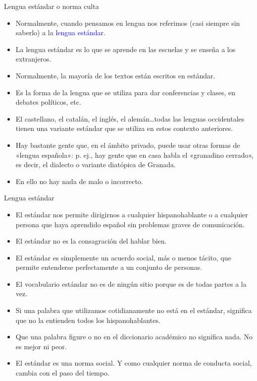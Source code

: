 \documentclass[handout]{beamer}
\begin{document}
\begin{frame}{Lengua estándar o norma culta}
\begin{itemize}
	\item Normalmente, cuando pensamos en lengua nos referimos (casi siempre sin saberlo) a la \textcolor{blue}{lengua estándar}.
	\item La lengua estándar es lo que se aprende en las escuelas y se enseña a los extranjeros.
	\item Normalmente, la mayoría de los textos están escritos en estándar.
	\item Es la forma de la lengua que se utiliza para dar conferencias y clases, en debates políticos, etc.
	\item El castellano, el catalán, el inglés, el alemán\ldots todas las lenguas occidentales tienen una variante estándar que se utiliza en estos contexto anteriores.
	\item Hay bastante gente que, en el ámbito privado, puede usar otras formas de «lengua española»: p. ej., hay gente que en casa habla el «granadino cerrado», es decir, el dialecto o variante diatópica de Granada.
	\item En ello no hay nada de malo o incorrecto.
\end{itemize}
\end{frame}

\begin{frame}{Lengua estándar}
\begin{itemize}
	\item El estándar nos permite dirigirnos a cualquier hispanohablante o a cualquier persona que haya aprendido español sin problemas graves de comunicación. 	
	\item El estándar no es la consagración del hablar bien.
	\item El estándar es simplemente un acuerdo social, más o menos tácito, que permite entenderse perfectamente a un conjunto de personas. 
	\item El vocabulario estándar no es de ningún sitio porque es de todas partes a la vez.
	\item Si una palabra que utilizamos cotidianamente no está en el estándar, significa que no la entienden todos los hispanohablantes.
	\item Que una palabra figure o no en el diccionario académico no significa nada. No es mejor ni peor. 
	\item El estándar es una norma social. Y como cualquier norma de conducta social, cambia con el paso del tiempo.
\end{itemize}
\end{frame}
\end{document}
